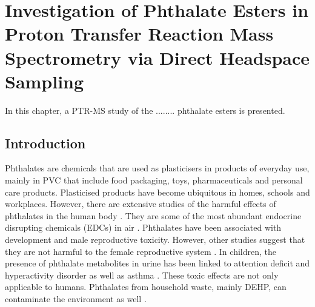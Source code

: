\chapter{Investigation of Phthalate Esters in Proton Transfer Reaction Mass Spectrometry via Direct Headspace Sampling}






In this chapter, a PTR-MS study of the ........ phthalate esters is presented.


\section{Introduction}

Phthalates are chemicals that are  used as plasticisers in products of everyday use, mainly in  PVC that include food packaging, toys, pharmaceuticals and personal care products.  Plasticised products have become ubiquitous in  homes, schools and workplaces.
However, there are extensive studies of the harmful effects of phthalates in the human body \cite{heudorf2007phthalates}. They are some of the most abundant  endocrine disrupting chemicals (EDCs) in air \cite{rudel2003phthalates}. Phthalates have been associated with development  and male reproductive \cite{foster2000effects,benson2009hazard,matsumoto2008potential} toxicity. However, other studies suggest that they are not harmful to the female reproductive system \cite{kay2013reproductive}.
In children, the presence of phthalate metabolites in urine has been linked to attention deficit and hyperactivity disorder \cite{kim2009phthalates} as well as  asthma \cite{bornehag2010phthalate}. These toxic effects are not only applicable to humans. Phthalates from household waste, mainly DEHP, can contaminate the environment as well \cite{bauer1997estimation}.




